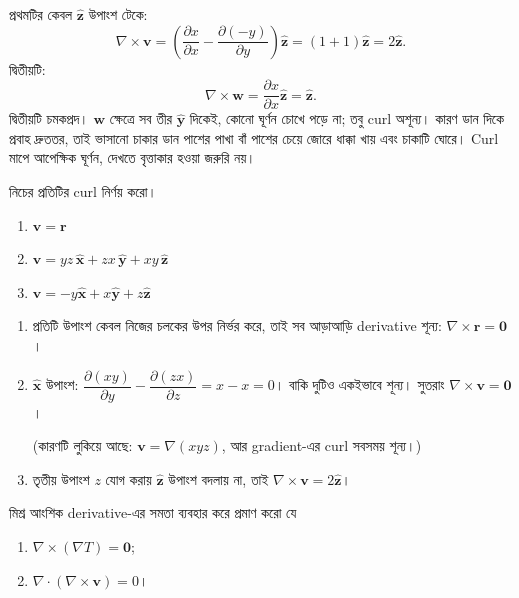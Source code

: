 \documentclass[11pt]{article}
\begin{document}
\begin{solbox}
প্রথমটির কেবল $\hat{\mathbf{z}}$ উপাংশ টেকে:
\[
  \nabla\times\mathbf{v}
  = \left( \frac{\partial x}{\partial x}
  - \frac{\partial(-y)}{\partial y} \right)\hat{\mathbf{z}}
  = (1+1)\hat{\mathbf{z}} = 2\hat{\mathbf{z}} .
\]
দ্বিতীয়টি:
\[
  \nabla\times\mathbf{w} = \frac{\partial x}{\partial x}\hat{\mathbf{z}}
  = \hat{\mathbf{z}} .
\]
দ্বিতীয়টি চমকপ্রদ। $\mathbf{w}$ ক্ষেত্রে সব তীর $\hat{\mathbf{y}}$ দিকেই,
কোনো ঘূর্ণন চোখে পড়ে না; তবু curl অশূন্য। কারণ ডান দিকে প্রবাহ দ্রুততর, তাই
ভাসানো চাকার ডান পাশের পাখা বাঁ পাশের চেয়ে জোরে ধাক্কা খায় এবং চাকাটি ঘোরে।
Curl মাপে আপেক্ষিক ঘূর্ণন, দেখতে বৃত্তাকার হওয়া জরুরি নয়।
\end{solbox}

 নিচের প্রতিটির curl নির্ণয় করো।
\begin{enumerate}
  \item $\mathbf{v} = \mathbf{r}$
  \item $\mathbf{v} = yz\,\hat{\mathbf{x}} + zx\,\hat{\mathbf{y}}
        + xy\,\hat{\mathbf{z}}$
  \item $\mathbf{v} = -y\hat{\mathbf{x}} + x\hat{\mathbf{y}}
        + z\hat{\mathbf{z}}$
\end{enumerate}

\begin{sol}
\begin{enumerate}
  \item প্রতিটি উপাংশ কেবল নিজের চলকের উপর নির্ভর করে, তাই সব আড়াআড়ি
        derivative শূন্য: $\nabla\times\mathbf{r} = \mathbf{0}$।
  \item $\hat{\mathbf{x}}$ উপাংশ: $\dfrac{\partial(xy)}{\partial y}
        - \dfrac{\partial(zx)}{\partial z} = x - x = 0$। বাকি দুটিও একইভাবে
        শূন্য। সুতরাং $\nabla\times\mathbf{v} = \mathbf{0}$।

        (কারণটি লুকিয়ে আছে: $\mathbf{v} = \nabla(xyz)$, আর gradient-এর curl
        সবসময় শূন্য।)
  \item তৃতীয় উপাংশ $z$ যোগ করায় $\hat{\mathbf{z}}$ উপাংশ বদলায় না, তাই
        $\nabla\times\mathbf{v} = 2\hat{\mathbf{z}}$।
\end{enumerate}
\end{sol}

 মিশ্র আংশিক derivative-এর সমতা ব্যবহার করে প্রমাণ করো যে
\begin{enumerate}
  \item $\nabla\times(\nabla T) = \mathbf{0}$;
  \item $\nabla\cdot(\nabla\times\mathbf{v}) = 0$।
\end{enumerate}
\end{document}
